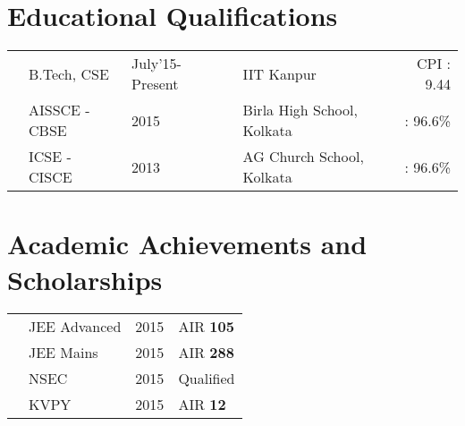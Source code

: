 \documentclass[11pt,a4paper]{moderncv}
\newcommand{\education}[5]{
  \textbf{\large{#1}} \hfill\textit{#2}\\
  #5 \hfill \large{#3 : \textbf{#4}}
}
\newcommand{\neducation}[5]{
  & #1 & #2 & &#5 & #3 : #4
}
\newcommand{\achievement}[2]{
  \item #1 \hfill \textit{#2}
}
\newcommand{\nachievement}[3]{
  & #1 & #2 & #3
}
\begin{document}
  \makecvtitle
  \section{Educational Qualifications}
  \begin{tabular}{L{0.05cm} L{6cm} l L{0.05cm} C{8cm} r}
      \neducation{B.Tech, CSE}{July'15-Present}{CPI}{9.44}{IIT Kanpur}\\
      \neducation{AISSCE - CBSE}{2015}{}{96.6\%}{Birla High School, Kolkata}\\
      \neducation{ICSE - CISCE}{2013}{}{96.6\%}{AG Church School, Kolkata}\\
    \end{tabular}
  \section{Academic Achievements and Scholarships}
  \begin{tabular}{L{0.05cm} L{6cm} C{8cm} l}
    \nachievement{JEE Advanced}{2015}{AIR \textbf{105}}\\
    \nachievement{JEE Mains}{2015}{AIR \textbf{288}}\\
    \nachievement{NSEC}{2015}{Qualified}\\
    \nachievement{KVPY}{2015}{AIR \textbf{12}}
  \end{tabular}
\end{document}
